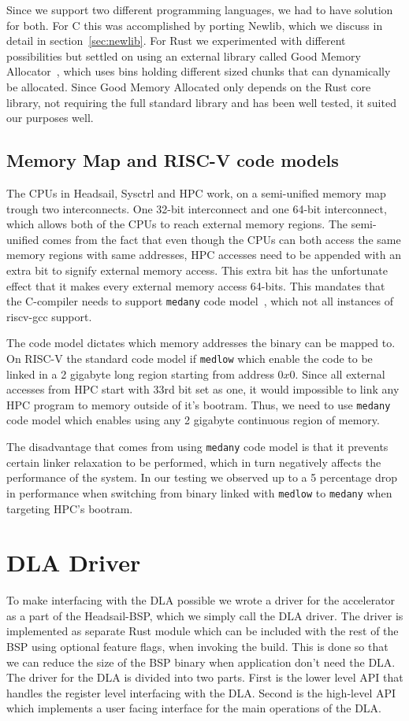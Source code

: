 \documentclass[12pt,a4paper,english
]{tunithesis}
\begin{document}
Since we support two different programming languages, we had to have solution for both. For C this was accomplished by porting Newlib, which we discuss in detail in section~\ref{sec:newlib}. For Rust we experimented with different possibilities but settled on using an external library called Good Memory Allocator~\cite{galloc_memory_allocator}, which uses bins holding different sized chunks that can dynamically be allocated. Since Good Memory Allocated only depends on the Rust core library, not requiring the full standard library and has been well tested, it suited our purposes well.

\subsection{Memory Map and RISC-V code models}
The CPUs in Headsail, Sysctrl and HPC work, on a semi-unified memory map trough two interconnects. One 32-bit interconnect and one 64-bit interconnect, which allows both of the CPUs to reach external memory regions. The semi-unified comes from the fact that even though the CPUs can both access the same memory regions with same addresses, HPC accesses need to be appended with an extra bit to signify external memory access. This extra bit has the unfortunate effect that it makes every external memory access 64-bits. This mandates that the C-compiler needs to support \texttt{medany} code model~\cite{sifive_riscv_code_models}, which not all instances of riscv-gcc support.

The code model dictates which memory addresses the binary can be mapped to. On RISC-V the standard code model if \texttt{medlow} which enable the code to be linked in a 2 gigabyte long region starting from address $0x0$. Since all external accesses from HPC start with 33rd bit set as one, it would impossible to link any HPC program to memory outside of it's bootram. Thus, we need to use \texttt{medany} code model which enables using any 2 gigabyte continuous region of memory.

The disadvantage that comes from using \texttt{medany} code model is that it prevents certain linker relaxation to be performed, which in turn negatively affects the performance of the system. In our testing we observed up to a 5 percentage drop in performance when switching from binary linked with \texttt{medlow} to \texttt{medany} when targeting HPC's bootram.

\section{DLA Driver}
To make interfacing with the DLA possible we wrote a driver for the accelerator as a part of the Headsail-BSP, which we simply call the DLA driver.
The driver is implemented as separate Rust module which can be included with the rest of the BSP using optional feature flags, when invoking the build. This is done so that we can reduce the size of the BSP binary when application don't need the DLA. The driver for the DLA is divided into two parts. First is the lower level API that handles the register level interfacing with the DLA. Second is the high-level API which implements a user facing interface for the main operations of the DLA.
\end{document}
